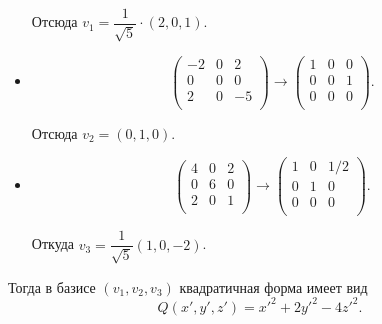 \documentclass[a4paper]{article}
\begin{document}
\begin{solution}
\begin{itemize}
            Отсюда $v_1 = \dfrac{1}{\sqrt{5}} \cdot (2, 0, 1)$.

        \item[\pmb{$t = 2$}]
            \begin{equation*}
                \begin{pmatrix}
                    -2 & 0 & 2 \\
                    0 & 0 & 0 \\
                    2 & 0 & -5 \\
                \end{pmatrix}
                \to
                \begin{pmatrix}
                    1 & 0 & 0 \\
                    0 & 0 & 1 \\
                    0 & 0 & 0 \\
                \end{pmatrix}.
            \end{equation*}

            Отсюда $v_2 = (0, 1, 0)$.

        \item[\pmb{$t = -4$}]
            \begin{equation*}
                \begin{pmatrix}
                    4 & 0 & 2 \\
                    0 & 6 & 0 \\
                    2 & 0 & 1 \\
                \end{pmatrix}
                \to
                \begin{pmatrix}
                    1 & 0 & 1/2 \\
                    0 & 1 & 0 \\
                    0 & 0 & 0 \\
                \end{pmatrix}.
            \end{equation*}

            Откуда $v_3 = \dfrac{1}{\sqrt{5}}(1, 0, -2)$.
        \end{itemize}

        Тогда в базисе $(v_1, v_2, v_3)$ квадратичная форма имеет вид
        \begin{equation*}
            Q(x', y', z') = x'^2 + 2y'^2 - 4z'^2.
        \end{equation*}


\end{solution}
\end{document}
